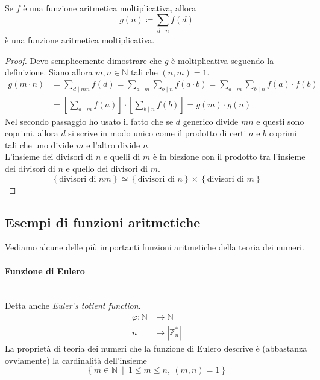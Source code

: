 \begin{proposizione}
	\label{somma_moltiplicativa}
	Se $f$ è una funzione aritmetica moltiplicativa, allora 
	\begin{equation*}
	g(n)\coloneqq \sum_{d\mid n}f(d)
	\end{equation*}
	è una funzione aritmetica moltiplicativa.
\end{proposizione}
\begin{proof}
	Devo semplicemente dimostrare che $g$ è moltiplicativa seguendo la definizione. Siano allora $m,n \in \mathbb{N}$ tali che $(n,m)=1$.
	\begin{align*}
	g(m \cdot n)&=\sum_{d\mid mn}f(d)=\sum_{a\mid m}\sum_{b\mid n}f(a\cdot b)=\sum_{a\mid m}\sum_{b\mid n}f(a)\cdot f(b) \\
	&=\left[\sum_{a\mid m}f(a)\right]\cdot\left[\sum_{b\mid n}f(b)\right]=g(m)\cdot g(n)
	\end{align*}
	Nel secondo passaggio ho usato il fatto che se $d$ generico divide $mn$ e questi sono coprimi, allora $d$ si scrive in modo unico come il prodotto di certi $a$ e $b$ coprimi tali che uno divide $m$ e l'altro divide $n$. \\ L'insieme dei divisori di $n$ e quelli di $m$ è in biezione con il prodotto tra l'insieme dei divisori di $n$ e quello dei divisori di $m$.
	\begin{equation*}
	\left\{\text{divisori di $nm$}\right\}\simeq\left\{\text{divisori di $n$}\right\}\times\left\{\text{divisori di $m$}\right\}
	\end{equation*}
\end{proof}




\subsection{Esempi di funzioni aritmetiche}
Vediamo alcune delle più importanti funzioni aritmetiche della teoria dei numeri.
\paragraph{Funzione di Eulero} \ \\ Detta anche \textit{Euler's totient function}.
\begin{align*}
\varphi: \mathbb{N}&\longrightarrow \mathbb{N}\\
n &\longmapsto |\mathbb{Z}_n^*|
\end{align*}
La proprietà di teoria dei numeri che la funzione di Eulero descrive è (abbastanza ovviamente) la cardinalità dell'insieme
\begin{equation*}
\left\{m\in\mathbb{N} \ \middle| \ 1\leq m \leq n, \ (m,n)=1\right\}
\end{equation*}
